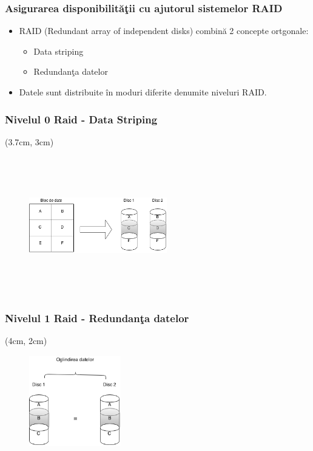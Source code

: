 \documentclass{beamer}
\begin{document}
\begin{frame}
    \frametitle{Asigurarea disponibilit\u{a}\c{t}ii cu ajutorul sistemelor RAID}
    \begin{itemize}
        \item RAID (Redundant array of independent disks) combin\u{a} 2 concepte ortgonale:
        \pause
            \begin{itemize}
                \item Data striping
                \pause
                \item Redundan\c{t}a datelor 
            \end{itemize}
        \pause
        \item Datele sunt distribuite \^{i}n moduri diferite denumite niveluri RAID.
    \end{itemize}
\end{frame}
\begin{frame}
    \frametitle{Nivelul 0 Raid - Data Striping}
    \begin{textblock*}{4cm}(3.7cm, 3cm)
        \begin{figure}
            \includegraphics[width=6cm,height=6cm,keepaspectratio]{img/raid/raid0.png}
       \end{figure}
    \end{textblock*}  
\end{frame}

\begin{frame}
    \frametitle{Nivelul 1 Raid - Redundan\c{t}a datelor}
    \begin{textblock*}{4cm}(4cm, 2cm)
        \begin{figure}
            \includegraphics[width=4cm,height=4cm,keepaspectratio]{img/raid/raid1.png}

            \caption{}
       \end{figure}
    \end{textblock*}  
\end{frame}
\end{document}

